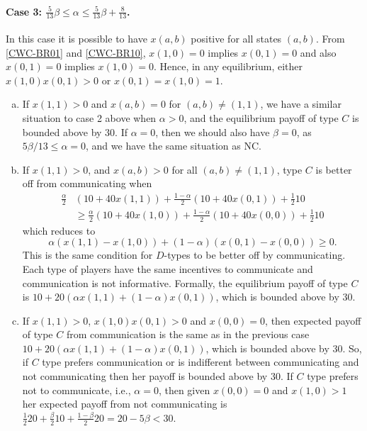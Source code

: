 \documentclass[12pt]{article}
\theoremstyle{break}
\begin{document}
\paragraph{Case 3: $\frac{5}{13}\beta\leq \alpha \leq \frac{5}{13}\beta+\frac{8}{13}$.} In this case it is possible to have $x(a,b)$ positive for all states $(a,b)$. From \eqref{CWC-BR01} and \eqref{CWC-BR10}, $x(1,0)=0$ implies $x(0,1)=0$ and also $x(0,1)=0$ implies $x(1,0)=0$. Hence, in any equilibrium, either $x(1,0)x(0,1)>0$ or $x(0,1)=x(1,0)=1$.
\begin{enumerate}[(a)]
	\item If $x(1,1)>0$ and $x(a,b)=0$ for $(a,b)\neq (1,1)$, we have a similar situation to case 2 above when $\alpha>0$, and the equilibrium payoff of type $C$ is bounded above by $30$. If $\alpha=0$, then we should also have $\beta=0$, as $5\beta / 13 \leq \alpha = 0$, and we have the same situation as NC.
	
	\item If $x(1,1)>0$, and $x(a,b)>0$ for all $(a,b)\neq (1,1)$, type $C$ is better off from communicating when
	\begin{equation*}
		\begin{split}
		\frac{\alpha}{2}& (10+40x(1,1))+\frac{1-\alpha}{2}(10+40x(0,1))+\frac{1}{2}10\\ 
		&\geq \frac{\alpha}{2} (10+40x(1,0))+\frac{1-\alpha}{2}(10+40x(0,0))+\frac{1}{2}10
		\end{split}
	\end{equation*} 
	which reduces to
	\begin{equation*}
		\alpha (x(1,1)-x(1,0))+(1-\alpha)(x(0,1)-x(0,0))\geq 0.
	\end{equation*}
	This is the same condition for $D$-types to be better off by communicating. Each type of players have the same incentives to communicate and communication is not informative. Formally, the equilibrium payoff of type $C$ is $10+20(\alpha x(1,1)+(1-\alpha)x(0,1))$, which is bounded above by $30$.
	
	\item If $x(1,1)>0$, $x(1,0)x(0,1)>0$ and $x(0,0)=0$, then expected payoff of type $C$ from communication is the same as in the previous case $10+20(\alpha x(1,1)+(1-\alpha)x(0,1))$, which is bounded above by 30. So, if $C$ type prefers communication or is indifferent between communicating and not communicating then her payoff is bounded above by 30. If $C$ type prefers not to communicate, i.e., $\alpha=0$, then given $x(0,0)=0$ and $x(1,0)>1$ her expected payoff from not communicating is $\frac{1}{2}20+\frac{\beta}{2}10+\frac{1-\beta}{2}20=20-5\beta<30$.
	

\end{enumerate}
\end{document}
